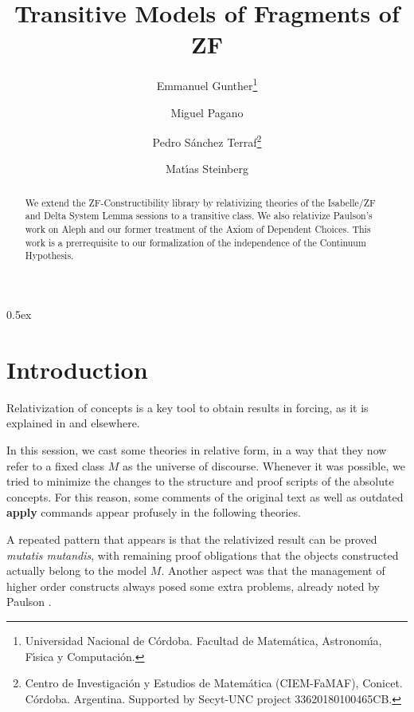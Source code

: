 \documentclass[11pt,a4paper]{article}
\begin{document}
\title{Transitive Models of Fragments of ZF}
\author{Emmanuel Gunther\thanks{Universidad Nacional de C\'ordoba.
    Facultad de Matem\'atica, Astronom\'{\i}a,  F\'{\i}sica y
    Computaci\'on.}
  \and
  Miguel Pagano\footnotemark[1]
  \and
  Pedro S\'anchez Terraf\footnotemark[1] \thanks{Centro de Investigaci\'on y Estudios de Matem\'atica
    (CIEM-FaMAF), Conicet. C\'ordoba. Argentina.
    Supported by Secyt-UNC project 33620180100465CB.}
  \and
  Mat\'{\i}as Steinberg\footnotemark[1]
}
\maketitle

\begin{abstract}
  We extend the ZF-Constructibility library by relativizing theories
  of the Isabelle/ZF and Delta System Lemma sessions to a transitive
  class. We also relativize Paulson's work on Aleph and our former
  treatment of the Axiom of Dependent Choices. This work is a
  prerrequisite to our formalization of the independence of the
  Continuum Hypothesis.
\end{abstract}


\tableofcontents

\parindent 0pt\parskip 0.5ex

\section{Introduction}

Relativization of concepts is a key tool to obtain results in forcing,
as it is explained in \cite[Sect.~3]{2020arXiv200109715G} and elsewhere.

In this session, we cast some theories in relative form, in a
way that they now refer to a fixed class $M$ as the universe of
discourse. Whenever it was possible, we tried to minimize the changes
to the structure and proof scripts of the absolute concepts. For
this reason, some comments of the original text as well as
outdated \textbf{apply} commands appear profusely in the following
theories.

A repeated pattern that appears is that the relativized result can be
proved \emph{mutatis mutandis}, with remaining proof obligations that
the objects constructed actually belong to the model $M$. Another
aspect was that the management of higher order constructs always posed
some extra problems, already noted by Paulson \cite[Sect.~7.3]{MR2051585}.
\end{document}
